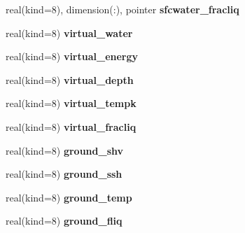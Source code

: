\begin{DoxyCompactItemize}
\item 
\hypertarget{structrk4__coms_1_1rk4patchtype_acc4f9181979298f3062a7009edfd080b}{
real(kind=8), dimension(:), pointer {\bfseries sfcwater\_\-fracliq}}
\label{structrk4__coms_1_1rk4patchtype_acc4f9181979298f3062a7009edfd080b}

\item 
\hypertarget{structrk4__coms_1_1rk4patchtype_afb1cdf0ac86fbe1120a9f389fca2585f}{
real(kind=8) {\bfseries virtual\_\-water}}
\label{structrk4__coms_1_1rk4patchtype_afb1cdf0ac86fbe1120a9f389fca2585f}

\item 
\hypertarget{structrk4__coms_1_1rk4patchtype_a7d974671aa3bf3b2a3189e6380479a84}{
real(kind=8) {\bfseries virtual\_\-energy}}
\label{structrk4__coms_1_1rk4patchtype_a7d974671aa3bf3b2a3189e6380479a84}

\item 
\hypertarget{structrk4__coms_1_1rk4patchtype_a4bb12d3aad94ab7dee728456152620b3}{
real(kind=8) {\bfseries virtual\_\-depth}}
\label{structrk4__coms_1_1rk4patchtype_a4bb12d3aad94ab7dee728456152620b3}

\item 
\hypertarget{structrk4__coms_1_1rk4patchtype_ae85ac1bec1ba7e7791e362db703101d4}{
real(kind=8) {\bfseries virtual\_\-tempk}}
\label{structrk4__coms_1_1rk4patchtype_ae85ac1bec1ba7e7791e362db703101d4}

\item 
\hypertarget{structrk4__coms_1_1rk4patchtype_a42c9e2a1de2b0cce8f6adba1ef236f03}{
real(kind=8) {\bfseries virtual\_\-fracliq}}
\label{structrk4__coms_1_1rk4patchtype_a42c9e2a1de2b0cce8f6adba1ef236f03}

\item 
\hypertarget{structrk4__coms_1_1rk4patchtype_a9d82c2b8d82b89c29d7099355de82d22}{
real(kind=8) {\bfseries ground\_\-shv}}
\label{structrk4__coms_1_1rk4patchtype_a9d82c2b8d82b89c29d7099355de82d22}

\item 
\hypertarget{structrk4__coms_1_1rk4patchtype_a4a1d3ae320be05ec4fe01c036377b65e}{
real(kind=8) {\bfseries ground\_\-ssh}}
\label{structrk4__coms_1_1rk4patchtype_a4a1d3ae320be05ec4fe01c036377b65e}

\item 
\hypertarget{structrk4__coms_1_1rk4patchtype_ae99232f03e4425fe3bcc96fe1ba4d965}{
real(kind=8) {\bfseries ground\_\-temp}}
\label{structrk4__coms_1_1rk4patchtype_ae99232f03e4425fe3bcc96fe1ba4d965}

\item 
\hypertarget{structrk4__coms_1_1rk4patchtype_a79fa840034bb0dc634bf5da59e7781b4}{
real(kind=8) {\bfseries ground\_\-fliq}}
\label{structrk4__coms_1_1rk4patchtype_a79fa840034bb0dc634bf5da59e7781b4}


\end{DoxyCompactItemize}
